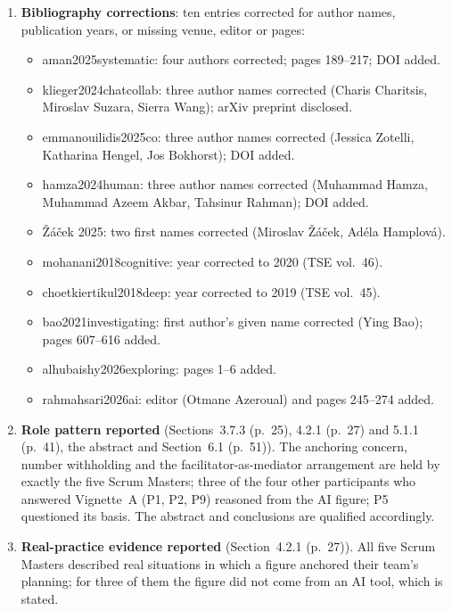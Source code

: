 \documentclass[12pt,a4paper,twoside]{article}
\begin{document}
\begin{enumerate}
  \item \textbf{Bibliography corrections}: ten entries corrected for author names,
        publication years, or missing venue, editor or pages:
        \begin{itemize}[noitemsep]
          \item aman2025systematic: four authors corrected; pages 189--217; DOI added.
          \item klieger2024chatcollab: three author names corrected (Charis Charitsis,
                Miroslav Suzara, Sierra Wang); arXiv preprint disclosed.
          \item emmanouilidis2025co: three author names corrected (Jessica Zotelli,
                Katharina Hengel, Jos Bokhorst); DOI added.
          \item hamza2024human: three author names corrected (Muhammad Hamza, Muhammad
                Azeem Akbar, Tahsinur Rahman); DOI added.
          \item \v{Z}\'{a}\v{c}ek 2025: two first names corrected (Miroslav
                \v{Z}\'{a}\v{c}ek, Ad\'{e}la Hamplov\'{a}).
          \item mohanani2018cognitive: year corrected to 2020 (TSE vol.~46).
          \item choetkiertikul2018deep: year corrected to 2019 (TSE vol.~45).
          \item bao2021investigating: first author's given name corrected (Ying Bao); pages 607--616 added.
          \item alhubaishy2026exploring: pages 1--6 added.
          \item rahmahsari2026ai: editor (Otmane Azeroual) and pages 245--274 added.
        \end{itemize}

  \item \textbf{Role pattern reported} (Sections~3.7.3 (p.~25), 4.2.1 (p.~27) and 5.1.1 (p.~41), the abstract
        and Section~6.1 (p.~51)). The anchoring concern, number withholding and the
        facilitator-as-mediator arrangement are held by exactly the five Scrum Masters;
        three of the four other participants who answered Vignette~A (P1, P2, P9) reasoned from the AI figure; P5 questioned its basis.
        The abstract and conclusions are qualified accordingly.

  \item \textbf{Real-practice evidence reported} (Section~4.2.1 (p.~27)). All five Scrum Masters
        described real situations in which a figure anchored their team's planning; for
        three of them the figure did not come from an AI tool, which is stated.


\end{enumerate}
\end{document}

